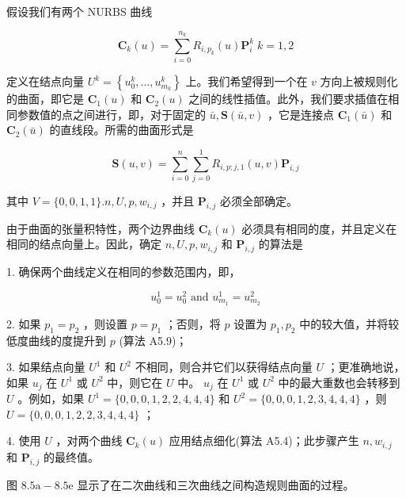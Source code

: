 \documentclass[../main.tex]{subfiles}
\begin{document}
假设我们有两个 NURBS 曲线

\[
{\mathbf{C}}_{k}\left( u\right)  = \mathop{\sum }\limits_{{i = 0}}^{{n}_{k}}{R}_{i,{p}_{k}}\left( u\right) {\mathbf{P}}_{i}^{k}\;k = 1,2
\]

定义在结点向量 \({U}^{k} = \left\{  {{u}_{0}^{k},\ldots ,{u}_{{m}_{k}}^{k}}\right\}\) 上。我们希望得到一个在 \(v\) 方向上被规则化的曲面，即它是 \({\mathbf{C}}_{1}\left( u\right)\) 和 \({\mathbf{C}}_{2}\left( u\right)\) 之间的线性插值。此外，我们要求插值在相同参数值的点之间进行，即，对于固定的 \(\bar{u},\mathbf{S}\left( {\bar{u},v}\right)\) ，它是连接点 \({\mathbf{C}}_{1}\left( \bar{u}\right)\) 和 \({\mathbf{C}}_{2}\left( \bar{u}\right)\) 的直线段。所需的曲面形式是

\[
\mathbf{S}\left( {u,v}\right)  = \mathop{\sum }\limits_{{i = 0}}^{n}\mathop{\sum }\limits_{{j = 0}}^{1}{R}_{i,p;j,1}\left( {u,v}\right) {\mathbf{P}}_{i,j} \tag{8.4}
\]

其中 \(V = \{ 0,0,1,1\} .n,U,p,{w}_{i,j}\) ，并且 \({\mathbf{P}}_{i,j}\) 必须全部确定。

由于曲面的张量积特性，两个边界曲线 \({\mathbf{C}}_{k}\left( u\right)\) 必须具有相同的度，并且定义在相同的结点向量上。因此，确定 \(n,U,p,{w}_{i,j}\) 和 \({\mathbf{P}}_{i,j}\) 的算法是

1. 确保两个曲线定义在相同的参数范围内，即，

\[
{u}_{0}^{1} = {u}_{0}^{2}\text{ and }{u}_{{m}_{1}}^{1} = {u}_{{m}_{2}}^{2}
\]

2. 如果 \({p}_{1} = {p}_{2}\) ，则设置 \(p = {p}_{1}\) ；否则，将 \(p\) 设置为 \({p}_{1},{p}_{2}\) 中的较大值，并将较低度曲线的度提升到 \(p\) (算法 A5.9)；

3. 如果结点向量 \({U}^{1}\) 和 \({U}^{2}\) 不相同，则合并它们以获得结点向量 \(U\) ；更准确地说，如果 \({u}_{j}\) 在 \({U}^{1}\) 或 \({U}^{2}\) 中，则它在 \(U\) 中。 \({u}_{j}\) 在 \({U}^{1}\) 或 \({U}^{2}\) 中的最大重数也会转移到 \(U\) 。例如，如果 \({U}^{1} = \{ 0,0,0,1,2,2,4,4,4\}\) 和 \({U}^{2} = \{ 0,0,0,1,2,3,4,4,4\}\) ，则 \(U = \{ 0,0,0,1,2,2,3,4,4,4\}\) ；

4. 使用 \(U\) ，对两个曲线 \({\mathbf{C}}_{k}\left( u\right)\) 应用结点细化(算法 A5.4)；此步骤产生 \(n,{w}_{i,j}\) 和 \({\mathbf{P}}_{i,j}\) 的最终值。

图 \({8.5}\mathrm{a} - {8.5}\mathrm{e}\) 显示了在二次曲线和三次曲线之间构造规则曲面的过程。
\end{document}
